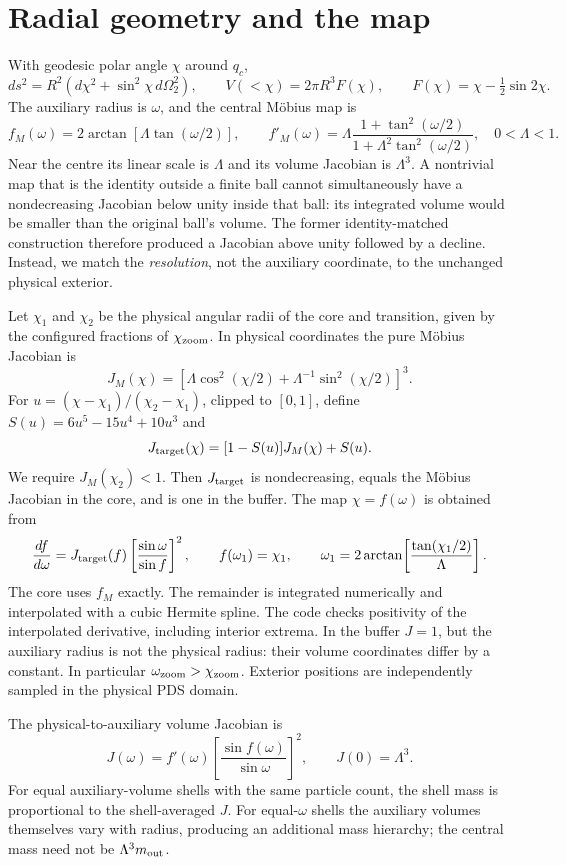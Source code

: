 \documentclass[11pt]{article}
\begin{document}
\section{Radial geometry and the map}
With geodesic polar angle \(\chi\) around \(q_c\),
\[
 ds^2=R^2(d\chi^2+\sin^2\chi\,d\Omega_2^2),\qquad
 V(<\chi)=2\pi R^3 F(\chi),\qquad
 F(\chi)=\chi-\tfrac12\sin 2\chi .
\]
The auxiliary radius is \(\omega\), and the central M\"obius map is
\[
 f_M(\omega)=2\arctan\!\left[\Lambda\tan(\omega/2)\right],\qquad
 f'_M(\omega)=\Lambda\frac{1+\tan^2(\omega/2)}
 {1+\Lambda^2\tan^2(\omega/2)},\quad 0<\Lambda<1.
\]
Near the centre its linear scale is \(\Lambda\) and its volume Jacobian is
\(\Lambda^3\). A nontrivial map that is the identity outside a finite ball
cannot simultaneously have a nondecreasing Jacobian below unity inside that
ball: its integrated volume would be smaller than the original ball's volume.
The former identity-matched construction therefore produced a Jacobian above
unity followed by a decline. Instead, we match the \emph{resolution}, not
the auxiliary coordinate, to the unchanged physical exterior.

Let \(\chi_1\) and \(\chi_2\) be the physical angular radii of the core and
transition, given by the configured fractions of \(\chi_{\rm zoom}\). In
physical coordinates the pure M\"obius Jacobian is
\[
 J_M(\chi)=\left[\Lambda\cos^2(\chi/2)
                  +\Lambda^{-1}\sin^2(\chi/2)\right]^3.
\]
For \(u=(\chi-\chi_1)/(\chi_2-\chi_1)\), clipped to \([0,1]\), define
\(S(u)=6u^5-15u^4+10u^3\) and
\[
 J_{\rm target}(\chi)=[1-S(u)]J_M(\chi)+S(u).
\]
We require \(J_M(\chi_2)<1\). Then \(J_{\rm target}\) is nondecreasing,
equals the M\"obius Jacobian in the core, and is one in the buffer. The map
\(\chi=f(\omega)\) is obtained from
\[
 \frac{df}{d\omega}=J_{\rm target}(f)
 \left[\frac{\sin\omega}{\sin f}\right]^2,
 \qquad f(\omega_1)=\chi_1,\qquad
 \omega_1=2\arctan\!\left[\frac{\tan(\chi_1/2)}{\Lambda}\right].
\]
The core uses \(f_M\) exactly. The remainder is integrated numerically and
interpolated with a cubic Hermite spline. The code checks positivity of the
interpolated derivative, including interior extrema. In the buffer \(J=1\),
but the auxiliary radius is not the physical radius: their volume coordinates
differ by a constant. In particular \(\omega_{\rm zoom}>\chi_{\rm zoom}\).
Exterior positions are independently sampled in the physical PDS domain.

The physical-to-auxiliary volume Jacobian is
\[
 J(\omega)=f'(\omega)
 \left[\frac{\sin f(\omega)}{\sin\omega}\right]^2,\qquad
 J(0)=\Lambda^3 .
\]
For equal auxiliary-volume shells with the same particle count, the shell
mass is proportional to the shell-averaged \(J\). For equal-\(\omega\)
shells the auxiliary volumes themselves vary with radius, producing an
additional mass hierarchy; the central mass need not be \(\Lambda^3 m_{\rm out}\).
\end{document}
